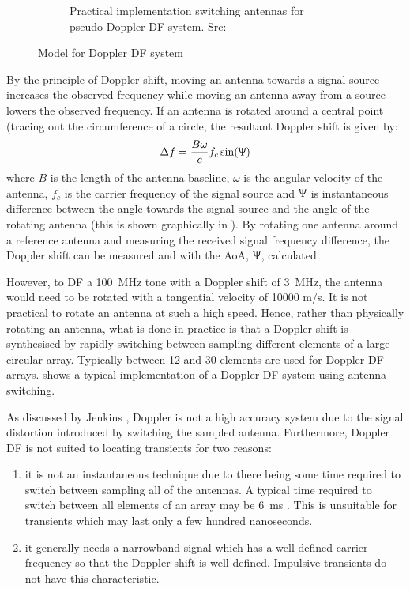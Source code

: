 \begin{figure}
\begin{subfigure}[b]{0.48\textwidth}
    \caption{Practical implementation switching antennas for pseudo-Doppler DF system. Src: \cite{jenkins1991smallaperture}}
  \end{subfigure}
  \caption{Model for Doppler DF system}
  \label{fig:lit-review-doppler-switching}
\end{figure}

By the principle of Doppler shift, moving an antenna towards a signal source increases the observed frequency while moving an antenna away from a source lowers the observed frequency. 
If an antenna is rotated around a central point (tracing out the circumference of a circle, the resultant Doppler shift is given by: \cite{poisel2012electronic}
\begin{equation} \label{eq:lit-review:doppler}
  \Delta f = \frac{B\omega}{c}f_c\sin(\Uppsi)
\end{equation}
where \(B\) is the length of the antenna baseline, \(\omega\) is the angular velocity of the antenna, \(f_c\) is the carrier frequency of the signal source and \(\Uppsi\) is instantaneous difference between the angle towards the signal source and the angle of the rotating antenna (this is shown graphically in ). By rotating one antenna around a reference antenna and measuring the received signal frequency difference, the Doppler shift can be measured and with  the AoA, \(\Uppsi\),  calculated.

However, to DF a \SI{100}{\mega\hertz} tone with a Doppler shift of \SI{3}{\mega\hertz}, the antenna would need to be rotated with a tangential velocity of 10000 m/s\cite{jenkins1991smallaperture}. 
It is not practical to rotate an antenna at such a high speed. 
Hence, rather than physically rotating an antenna, what is done in practice is that a Doppler shift is synthesised by rapidly switching between sampling different elements of a large circular array. 
Typically between 12 and 30 elements are used for Doppler DF arrays. 
 shows a typical implementation of a Doppler DF system using antenna switching.

As discussed by Jenkins \cite{jenkins1991smallaperture}, Doppler is not a high accuracy system due to the signal distortion introduced by switching the sampled antenna. Furthermore, Doppler DF is not suited to locating transients for two reasons:
\begin{enumerate}
  \item it is not an instantaneous technique due to there being some time required to switch between sampling all of the antennas. A typical time required to switch between all elements of an array may be \SI{6}{\milli\second} \cite{rhode2000introtodf}. This is unsuitable for transients which may last only a few hundred nanoseconds.
  \item it generally needs a narrowband signal which has a well defined carrier frequency so that the Doppler shift is well defined. Impulsive transients do not have this characteristic.
\end{enumerate}

